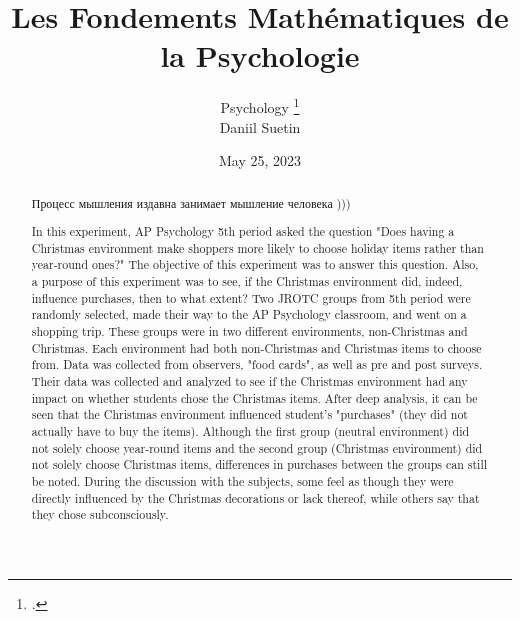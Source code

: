 \documentclass[twoside]{article}
\title{\vspace{-15mm}\fontsize{24pt}{10pt}\selectfont\textbf{Les Fondements Mathématiques de la Psychologie}} %
\author{Psychology
\large
\textsc{}\thanks{.}\\[2mm] %
\normalsize Daniil Suetin \\
\normalsize \href{mailto:}{} %
\vspace{-5mm}
}
\date{May 25, 2023}
\begin{document}
\maketitle %
\thispagestyle{fancy} %


\begin{abstract}
Процесс мышления издавна занимает мышление человека )))


In this experiment, AP Psychology 5th period asked the question "Does having a Christmas environment make shoppers more likely to choose holiday items rather than year-round ones?" The objective of this experiment was to answer this question. Also, a purpose of this experiment was to see, if the Christmas environment did, indeed, influence purchases, then to what extent? Two JROTC groups from 5th period were randomly selected, made their way to the AP Psychology classroom, and went on a shopping trip. These groups were in two different environments, non-Christmas and Christmas. Each environment had both non-Christmas and Christmas items to choose from. Data was collected from observers, "food cards", as well as pre and post surveys. Their data was collected and analyzed to see if the Christmas environment had any impact on whether students chose the Christmas items. After deep analysis, it can be seen that the Christmas environment influenced student's "purchases" (they did not actually have to buy the items). Although the first group (neutral environment) did not solely choose year-round items and the second group (Christmas environment) did not solely choose Christmas items, differences in purchases between the groups can still be noted. During the discussion with the subjects, some feel as though they were directly influenced by the Christmas decorations or lack thereof, while others say that they chose subconsciously. 

\end{abstract}

\end{document}
